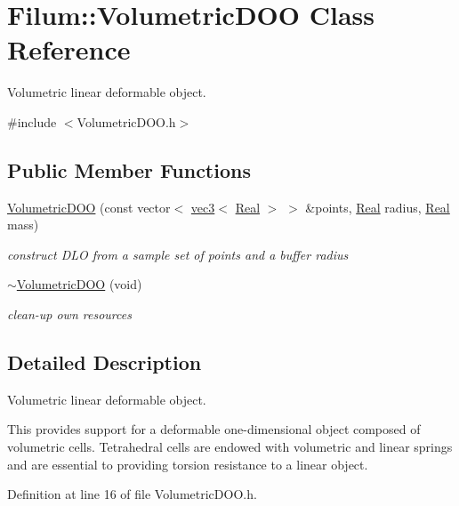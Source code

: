 \hypertarget{class_filum_1_1_volumetric_d_o_o}{\section{Filum\-:\-:Volumetric\-D\-O\-O Class Reference}
\label{class_filum_1_1_volumetric_d_o_o}
}


Volumetric linear deformable object.  




{\ttfamily \#include $<$Volumetric\-D\-O\-O.\-h$>$}

\subsection*{Public Member Functions}
\begin{DoxyCompactItemize}
\item 
\hyperlink{class_filum_1_1_volumetric_d_o_o_a4e9147fc3c76445b5054515d7ca5df0f}{Volumetric\-D\-O\-O} (const vector$<$ \hyperlink{structvmath_1_1vec3}{vec3}$<$ \hyperlink{stdafx_8h_a445a5f0e2a34c9d97d69a3c2d1957907}{Real} $>$ $>$ \&points, \hyperlink{stdafx_8h_a445a5f0e2a34c9d97d69a3c2d1957907}{Real} radius, \hyperlink{stdafx_8h_a445a5f0e2a34c9d97d69a3c2d1957907}{Real} mass)
\begin{DoxyCompactList}\small\item\em construct D\-L\-O from a sample set of points and a buffer radius \end{DoxyCompactList}\item 
\hyperlink{class_filum_1_1_volumetric_d_o_o_ad1c3b13b9351c30b1eac94c4469d7944}{$\sim$\-Volumetric\-D\-O\-O} (void)
\begin{DoxyCompactList}\small\item\em clean-\/up own resources \end{DoxyCompactList}\end{DoxyCompactItemize}


\subsection{Detailed Description}
Volumetric linear deformable object. 

This provides support for a deformable one-\/dimensional object composed of volumetric cells. Tetrahedral cells are endowed with volumetric and linear springs and are essential to providing torsion resistance to a linear object. 

Definition at line 16 of file Volumetric\-D\-O\-O.\-h.



